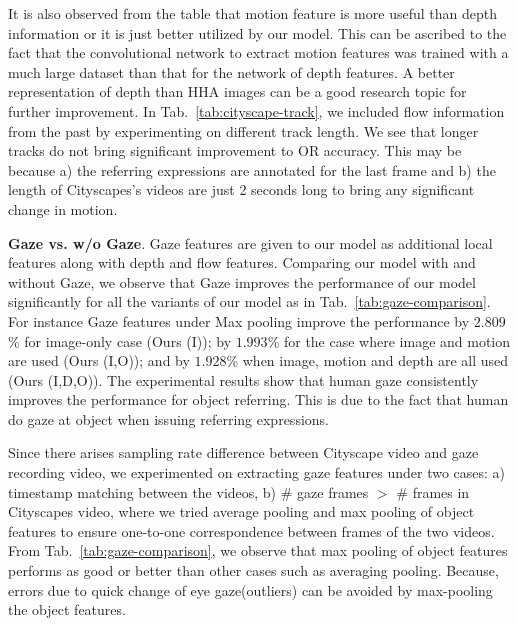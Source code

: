 \documentclass[10pt,twocolumn,letterpaper]{article}
\begin{document}
It is also observed from the table that motion feature is more useful than depth information or it is just better utilized by our model. This can be ascribed to the fact that the convolutional network to extract motion features was trained with a much large dataset than that for the network of depth features. A better representation of depth than HHA images can be a good research topic for further improvement. 
In Tab.~\ref{tab:cityscape-track}, we included flow information from the past by experimenting on different track length. We see that longer tracks do not bring significant improvement to OR accuracy. This may be because a) the referring expressions are annotated for the last frame and b) the length of Cityscapes's videos are just 2 seconds long to bring any significant change in motion. 


\bigskip
\noindent
\textbf{Gaze vs. w/o Gaze}.
Gaze features are given to our model as additional local features along with depth and flow features. Comparing our model with and without Gaze, we observe that Gaze improves the performance of our model significantly for all the variants of our model as in Tab.~\ref{tab:gaze-comparison}. For instance Gaze features under Max pooling improve the performance by $2.809$\% for image-only case (Ours (I)); by $1.993$\% for the case where image and motion are used (Ours (I,O)); and by $1.928$\% when image, motion and depth are all used (Ours (I,D,O)). The experimental results show that human gaze consistently improves the performance for object referring. This is due to the fact that human do gaze at object when issuing referring expressions. 

Since there arises sampling rate difference between Cityscape video and gaze recording video, we experimented on extracting gaze features under two cases: a) timestamp matching between the videos, b) \# gaze frames $>$ \# frames in Cityscapes video, where we tried average pooling and max pooling of object features to ensure one-to-one correspondence between frames of the two videos. From Tab.~\ref{tab:gaze-comparison}, we observe that max pooling of object features performs as good or better than other cases such as averaging pooling. Because, errors due to quick change of eye gaze(outliers) can be avoided by max-pooling the object features.
\end{document}
